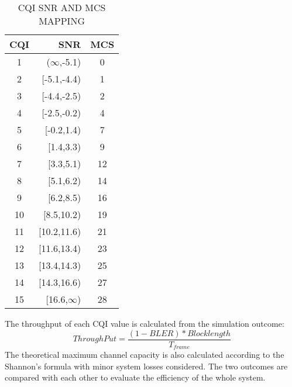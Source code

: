 \documentclass[journal,comsoc]{IEEEtran}
\begin{document}
\begin{table}[!h]
\centering
\caption{CQI SNR AND MCS MAPPING}
\label{my-label}
\begin{tabular}{crc}
\hline
CQI & SNR & MCS\\
\hline
1 & ($\infty$,-5.1) & 0 \\
2 & [-5.1,-4.4) & 1\\
3 & [-4.4,-2.5) & 2\\
4 & [-2.5,-0.2) & 4\\
5 & [-0.2,1.4) & 7\\
6 & [1.4,3.3) & 9\\
7 & [3.3,5.1) & 12\\
8 & [5.1,6.2) & 14\\
9 & [6.2,8.5) & 16\\
10 & [8.5,10.2) & 19\\
11 & [10.2,11.6) & 21\\
12 & [11.6,13.4) & 23\\
13 & [13.4,14.3) & 25\\
14 & [14.3,16.6) & 27\\
15 & [16.6,$\infty$) & 28\\
\hline
\end{tabular}
\end{table}

The throughput of each CQI value is calculated from the simulation outcome:
\[ThroughPut = \frac{(1-BLER) * Blocklength}{T_{frame}} \]
The theoretical maximum channel capacity is also calculated according to the Shannon’s formula with minor system losses considered. The two outcomes are compared with each other to evaluate the efficiency of the whole system.
\end{document}
